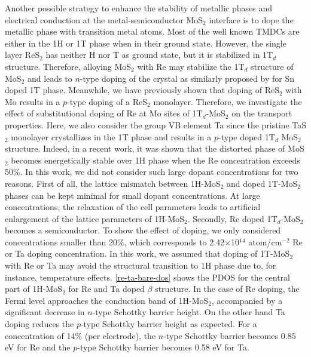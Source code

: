 Another possible strategy to enhance the stability of metallic phases and electrical conduction at the metal-semiconductor MoS$_2$ interface is to dope the metallic phase with transition metal atoms. Most of the well known TMDCs are either in the 1H or 1T phase when in their ground state. However, the single layer ReS$_2$ has neither H nor T as ground state, but it is stabilized in 1T$_d$ structure\cite{res2-cakir}. Therefore, alloying MoS$_2$ with Re may stabilize the 1T$_d$ structure of MoS$_{2}$ and leads to $n$-type doping of the crystal as similarly proposed by \citet{Raffone} for Sn doped 1T phase.  Meanwhile, we have previously shown that doping of ReS$_2$ with Mo results in a $p$-type doping of a ReS$_2$ monolayer\cite{res2-cakir}. Therefore, we investigate the effect of substitutional doping of Re at Mo sites of 1T$_d$-MoS$_2$ on the transport properties. Here, we also consider the group VB element Ta since the pristine TaS$_2$ monolayer crystallizes in the 1T phase and results in  a $p$-type doped 1T$_d$ MoS$_{2}$ structure. Indeed, in a recent work, it was shown that the distorted phase of MoS$_2$ becomes energetically stable over 1H phase when the Re concentration exceeds 50\%\cite{doi:10.1021/acs.jpcc.5b10739}. In this work, we did not consider such large dopant concentrations for two reasons. First of all, the lattice mismatch between 1H-MoS$_2$ and doped 1T-MoS$_2$ phases can be kept minimal for small dopant concentrations. At large concentrations, the relaxation of the cell parameters leads to artificial enlargement of the lattice parameters of  1H-MoS$_2$. Secondly, Re doped 1T$_d$-MoS$_2$ becomes a semiconductor. To show the effect of doping, we only considered concentrations smaller than 20\%, which corresponds to 2.42$\times$10$^{14}$ atom/cm$^{-2}$ Re or Ta doping concentration. In this work, we assumed that doping of 1T-MoS$_2$ with Re or Ta may avoid the structural transition to 1H phase due to, for instance, temperature effects. \autoref{re-ta-bare-dos} shows the PDOS for the central part of 1H-MoS$_2$ for Re and Ta doped $\beta$ structure. In the case of Re doping, the Fermi level approaches the conduction band of 1H-MoS$_2$, accompanied by a significant decrease in $n$-type Schottky barrier height. On the other hand Ta doping reduces the $p$-type Schottky barrier height as expected. For a concentration of 14\% (per electrode), the $n$-type Schottky barrier becomes 0.85 eV for Re and the $p$-type Schottky barrier becomes 0.58 eV for Ta.

